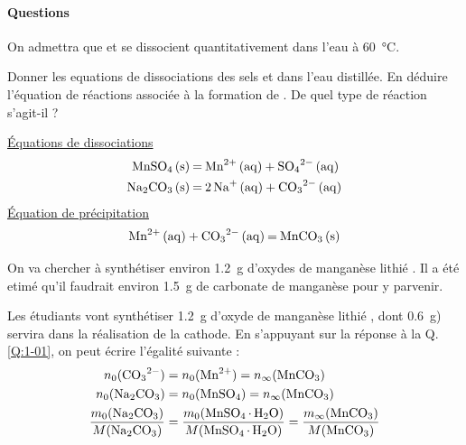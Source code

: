 \documentclass[twoside,a4paper,11pt,addpoints,answers]{exam}%
\begin{document}
\paragraph*{Questions}

On admettra que  et  se dissocient quantitativement dans l'eau à \SI{60}{\celsius}.

\begin{questions}
\question[1\half] \label{Q:1-01} {\color{purple} Donner les equations de dissociations des sels  et  dans l'eau distillée. En déduire l'équation de réactions associée à la formation de . De quel type de réaction s'agit-il ?}

\begin{mybox}
\begin{solution}[4cm]
\underline{\'{E}quations de dissociations}
\begin{align*}
\ce{MnSO4 (s) &= Mn^{2+} (aq) + SO4^{2-} (aq)} \\
\ce{Na2CO3 (s) &= 2 Na^+ (aq) + CO3^{2-} (aq)}
\end{align*}
\underline{\'{E}quation de précipitation}
\begin{align*}
\ce{Mn^{2+} (aq) + CO3^{2-} (aq) = MnCO3 (s)}
\end{align*}
\end{solution}
\end{mybox}


On va chercher à synthétiser environ \SI{1.2}{\gram} d'oxydes de manganèse lithié . Il a été etimé qu'il faudrait environ \SI{1.5}{\gram} de carbonate de manganèse  pour y parvenir.


\begin{mybox}\begin{solution}[6cm]
Les étudiants vont synthétiser \SI{1.2}{\gram} d'oxyde de manganèse lithié , dont \SI{0.6}{\gram}) servira dans la réalisation de la cathode.
En s'appuyant sur la réponse à la Q. \ref{Q:1-01}, on peut écrire l'égalité suivante : 
\begin{align*}
n_0 (\ce{CO3^{2-}}) &= n_0 (\ce{Mn^{2+}}) = n_\infty ( \ce{MnCO3} ) \\
n_0 (\ce{Na2CO3}) &= n_0 (\ce{MnSO4}) = n_\infty ( \ce{MnCO3} ) \\
\frac{m_0 (\ce{Na2CO3})}{M (\ce{Na2CO3})} &= \frac{m_0 (\ce{MnSO4.H2O})}{M (\ce{MnSO4.H2O})} = \frac{m_\infty ( \ce{MnCO3} )}{M( \ce{MnCO3} )}
\end{align*}


\end{solution}
\end{mybox}
\end{questions}
\end{document}
